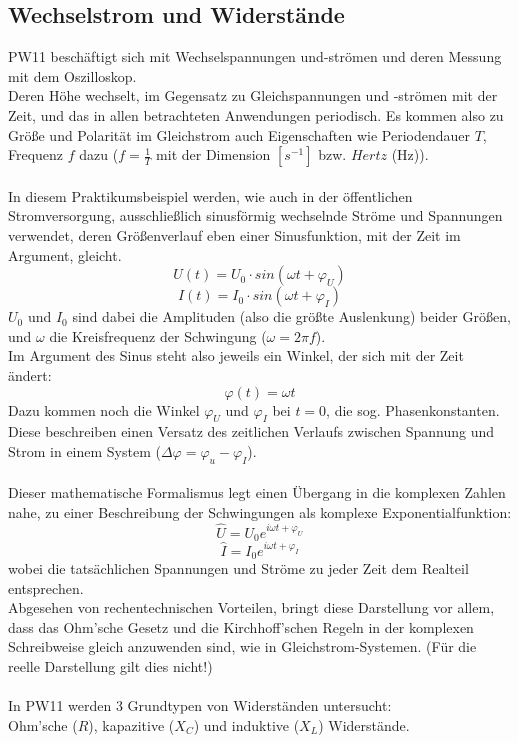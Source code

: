 \documentclass[12pt,a4paper]{article}
\begin{document}
\begin{multicols}{2}
\subsection{Wechselstrom und Widerstände}
PW11 beschäftigt sich mit Wechselspannungen und-strömen und deren Messung mit dem Oszilloskop.\\
Deren Höhe wechselt, im Gegensatz zu Gleichspannungen und -strömen mit der Zeit, und das in allen betrachteten Anwendungen periodisch. Es kommen also zu Größe und Polarität im Gleichstrom auch Eigenschaften wie Periodendauer $T$, Frequenz $f$ dazu ($f = \frac{1}{T}$ mit der Dimension $[s^{-1}]$ bzw. $Hertz$ (Hz)).\\
\\
In diesem Praktikumsbeispiel werden, wie auch in der öffentlichen Stromversorgung, ausschließlich sinusförmig wechselnde Ströme und Spannungen verwendet, deren Größenverlauf eben einer Sinusfunktion, mit der Zeit im Argument, gleicht.\\
$$U(t)=U_0\cdot sin(\omega t + \varphi_U)$$
$$I(t)=I_0\cdot sin(\omega t + \varphi_I)$$
$U_0$ und $I_0$ sind dabei die Amplituden (also die größte Auslenkung) beider Größen, und $\omega$ die Kreisfrequenz der Schwingung ($\omega = 2 \pi f$).\\
Im Argument des Sinus steht also jeweils ein Winkel, der sich mit der Zeit ändert:
$$\varphi (t) = \omega t$$
Dazu kommen noch die Winkel $\varphi_U$ und $\varphi_I $ bei $t=0$, die sog. Phasenkonstanten. Diese beschreiben einen Versatz des zeitlichen Verlaufs zwischen Spannung und Strom in einem System ($\Delta \varphi = \varphi_u - \varphi_I$).\\
\\
Dieser mathematische Formalismus legt einen Übergang in die komplexen Zahlen nahe, zu einer Beschreibung der Schwingungen als komplexe Exponentialfunktion:
$$\hat{U} = U_0e^{i \omega t + \varphi_U}$$
$$\hat{I} = I_0e^{i \omega t + \varphi_I}$$
wobei die tatsächlichen Spannungen und Ströme zu jeder Zeit dem Realteil entsprechen.\\
Abgesehen von rechentechnischen Vorteilen, bringt diese Darstellung vor allem, dass das Ohm'sche Gesetz und die Kirchhoff'schen Regeln in der komplexen Schreibweise gleich anzuwenden sind, wie in Gleichstrom-Systemen. (Für die reelle Darstellung gilt dies nicht!)\\
\\
In PW11 werden 3 Grundtypen von Widerständen untersucht:\\
Ohm'sche ($R$), kapazitive ($X_C$) und induktive ($X_L$) Widerstände.\\

\end{multicols}
\end{document}
